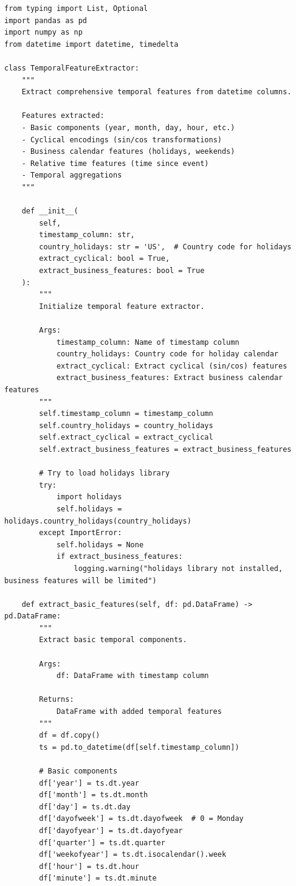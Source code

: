 \begin{lstlisting}[style=python, caption={Comprehensive Temporal Feature Engineering}]
from typing import List, Optional
import pandas as pd
import numpy as np
from datetime import datetime, timedelta

class TemporalFeatureExtractor:
    """
    Extract comprehensive temporal features from datetime columns.

    Features extracted:
    - Basic components (year, month, day, hour, etc.)
    - Cyclical encodings (sin/cos transformations)
    - Business calendar features (holidays, weekends)
    - Relative time features (time since event)
    - Temporal aggregations
    """

    def __init__(
        self,
        timestamp_column: str,
        country_holidays: str = 'US',  # Country code for holidays
        extract_cyclical: bool = True,
        extract_business_features: bool = True
    ):
        """
        Initialize temporal feature extractor.

        Args:
            timestamp_column: Name of timestamp column
            country_holidays: Country code for holiday calendar
            extract_cyclical: Extract cyclical (sin/cos) features
            extract_business_features: Extract business calendar features
        """
        self.timestamp_column = timestamp_column
        self.country_holidays = country_holidays
        self.extract_cyclical = extract_cyclical
        self.extract_business_features = extract_business_features

        # Try to load holidays library
        try:
            import holidays
            self.holidays = holidays.country_holidays(country_holidays)
        except ImportError:
            self.holidays = None
            if extract_business_features:
                logging.warning("holidays library not installed, business features will be limited")

    def extract_basic_features(self, df: pd.DataFrame) -> pd.DataFrame:
        """
        Extract basic temporal components.

        Args:
            df: DataFrame with timestamp column

        Returns:
            DataFrame with added temporal features
        """
        df = df.copy()
        ts = pd.to_datetime(df[self.timestamp_column])

        # Basic components
        df['year'] = ts.dt.year
        df['month'] = ts.dt.month
        df['day'] = ts.dt.day
        df['dayofweek'] = ts.dt.dayofweek  # 0 = Monday
        df['dayofyear'] = ts.dt.dayofyear
        df['quarter'] = ts.dt.quarter
        df['weekofyear'] = ts.dt.isocalendar().week
        df['hour'] = ts.dt.hour
        df['minute'] = ts.dt.minute


\end{lstlisting}
